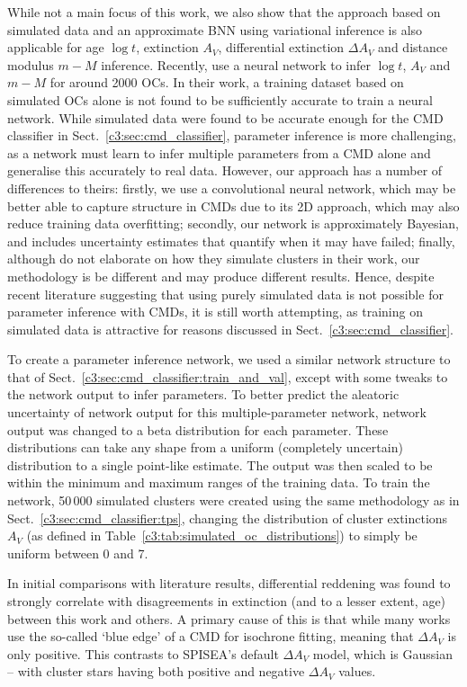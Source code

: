 While not a main focus of this work, we also show that the approach based on simulated data and an approximate BNN using variational inference is also applicable for age $\log t$, extinction $A_V$, differential extinction $\Delta A_V$ and distance modulus $m-M$ inference. Recently, \cite{cantat-gaudin_painting_2020} use a neural network to infer $\log t$, $A_V$ and $m-M$ for around 2000 OCs. In their work, a training dataset based on simulated OCs alone is not found to be sufficiently accurate to train a neural network. While simulated data were found to be accurate enough for the CMD classifier in Sect.~\ref{c3:sec:cmd_classifier}, parameter inference is more challenging, as a network must learn to infer multiple parameters from a CMD alone and generalise this accurately to real data. However, our approach has a number of differences to theirs: firstly, we use a convolutional neural network, which may be better able to capture structure in CMDs due to its 2D approach, which may also reduce training data overfitting; secondly, our network is approximately Bayesian, and includes uncertainty estimates that quantify when it may have failed; finally, although \cite{cantat-gaudin_painting_2020} do not elaborate on how they simulate clusters in their work, our methodology is be different and may produce different results. Hence, despite recent literature suggesting that using purely simulated data is not possible for parameter inference with CMDs, it is still worth attempting, as training on simulated data is attractive for reasons discussed in Sect.~\ref{c3:sec:cmd_classifier}.

To create a parameter inference network, we used a similar network structure to that of Sect.~\ref{c3:sec:cmd_classifier:train_and_val}, except with some tweaks to the network output to infer parameters. To better predict the aleatoric uncertainty of network output for this multiple-parameter network, network output was changed to a beta distribution for each parameter. These distributions can take any shape from a uniform (completely uncertain) distribution to a single point-like estimate. The output was then scaled to be within the minimum and maximum ranges of the training data. To train the network, 50\,000 simulated clusters were created using the same methodology as in Sect.~\ref{c3:sec:cmd_classifier:tps}, changing the distribution of cluster extinctions $A_V$ (as defined in Table~\ref{c3:tab:simulated_oc_distributions}) to simply be uniform between 0 and 7.

In initial comparisons with literature results, differential reddening was found to strongly correlate with disagreements in extinction (and to a lesser extent, age) between this work and others. A primary cause of this is that while many works \citep[e.g.][]{cantat-gaudin_painting_2020, bossini_age_2019} use the so-called `blue edge' of a CMD for isochrone fitting, meaning that $\Delta A_V$ is only positive. This contrasts to SPISEA's default $\Delta A_V$ model, which is Gaussian -- with cluster stars having both positive and negative $\Delta A_V$ values. 

